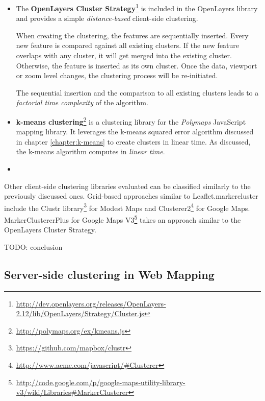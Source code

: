 \begin{itemize}
\item The \textbf{OpenLayers Cluster Strategy}\footnote{\url{http://dev.openlayers.org/releases/OpenLayers-2.12/lib/OpenLayers/Strategy/Cluster.js}} is included in the OpenLayers library and provides a simple \textit{distance-based} client-side clustering.

When creating the clustering, the features are sequentially inserted. Every new feature is compared against all existing clusters. If the new feature overlaps with any cluster, it will get merged into the existing cluster. Otherwise, the feature is inserted as its own cluster. Once the data, viewport or zoom level changes, the clustering process will be re-initiated. 

The sequential insertion and the comparison to all existing clusters leads to a \textit{factorial time complexity} of the algorithm. 

\item \textbf{k-means clustering}\footnote{\url{http://polymaps.org/ex/kmeans.js}} is a clustering library for the \textit{Polymaps} JavaScript mapping library. It leverages the k-means squared error algorithm discussed in chapter \ref{chapter:k-means} to create clusters in linear time. As discussed, the k-means algorithm computes in \textit{linear time}.

\item 
\end{itemize}

Other client-side clustering libraries evaluated can be classified similarly to the previously discussed ones. Grid-based approaches similar to Leaflet.markercluster include the Clustr library\footnote{\url{https://github.com/mapbox/clustr}} for Modest Maps and Clusterer2\footnote{\url{http://www.acme.com/javascript/\#Clusterer}} for Google Maps. MarkerClustererPlus for Google Maps V3\footnote{\url{http://code.google.com/p/google-maps-utility-library-v3/wiki/Libraries\#MarkerClusterer}} takes an approach similar to the OpenLayers Cluster Strategy.

TODO: conclusion

\subsection{Server-side clustering in Web Mapping}





